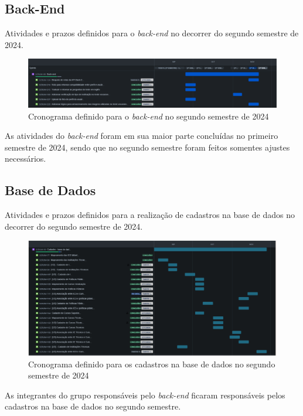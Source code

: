 \begin{apendicesenv}
\subsection*{Back-End}
Atividades e prazos definidos para o \textit{back-end} no decorrer do segundo semestre de 2024.

\begin{figure}[ht]
        \centering
\includegraphics[width=1.0\textwidth]{images/back-end-cronograma.png}
        \caption{Cronograma definido para o \textit{back-end} no segundo semestre de 2024}
        \label{fig:backendcronograma}
    \end{figure}
As atividades do \textit{back-end} foram em sua maior parte concluídas no primeiro semestre de 2024, sendo que no segundo semestre foram feitos somentes ajustes necessários.    
\newpage
    
\subsection*{Base de Dados}
Atividades e prazos definidos para a realização de cadastros na base de dados no decorrer do segundo semestre de 2024. 

\begin{figure}[ht]
        \centering
\includegraphics[width=1.0\textwidth]{images/base-dados-cronograma.png}
        \caption{Cronograma definido para os cadastros na base de dados no segundo semestre de 2024}
        \label{fig:basedadoscronograma}
    \end{figure}
As integrantes do grupo responsáveis pelo \textit{back-end} ficaram responsáveis pelos cadastros na base de dados no segundo semestre.


\end{apendicesenv}
